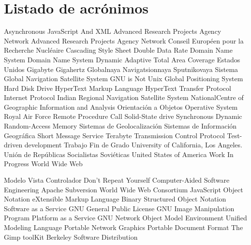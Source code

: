 \chapter{Listado de acrónimos}

{\small
\begin{acronym}[XXXXXXXX]
	         {Asynchronous JavaScript And XML}
	        {Advanced Research Projects Agency Network}
	        {Advanced Research Projects Agency Network}
	           {Conseil Européen pour la Recherche Nucléaire}
	            {Cascading Style Sheet}
	            {Double Data Rate}
	            {Domain Name System}
	            {Domain Name System}
	        {Dynamic Adaptive Total Area Coverage}
	         {Estados Unidos}
	             {Gigabyte}
	            {Gigahertz}
	        {Globalnaya Navigatsionnaya Sputnikovaya Sistema}
	           {Global Navigation Satellite System}
	            {\acs{GNU} is Not Unix}
	            {Global Positioning System}
	            {Hard Disk Drive}
	           {HyperText Markup Language}
	           {HyperText Transfer Protocol}
	             {Internet Protocol}
	          {Indian Regional Navigation Satellite System}
	          {NationalCentre of Geographic Information and Analysis}
	             {Orientación a Objetos}
	             {Operative System}
	            {Royal Air Force}
	            {Remote Procedure Call}
	            {Solid-State drive}
	          {Synchronous Dynamic Random-Access Memory}
	             {Sistemas de Geolocalización}
	            {Sistemas de Información Geográfica}
	            {Short Message Service}
	             {Terabyte}
	            {Transmission Control Protocol}
	            {Test-driven development}
	            {Trabajo Fin de Grado}
	           {University of California, Los Angeles}.
	           {Unión de Repúblicas Socialistas Soviéticas}
	            {United States of America}
	            {Work In Progress}
	            {World Wide Web}
	
			{Modelo Vista Controlador}
			{Don't Repeat Yourself}
			{Computer-Aided Software Engineering}
			{Apache Subversion}
			{World Wide Web Consortium}
			{JavaScript Object Notation}
			{eXtensible Markup Language}
			{Binary Structured Object Notation}
			{Software as a Service}
			{\acs{GNU} General Public License}
			{\acs{GNU} Image Manipulation Program} 
			{Platform as a Service}
		{GNU Network Object Model Environment}
			{Unified Modeling Language}
			{Portable Network Graphics}
			{Portable Document Format}
			{The Gimp toolKit}
			{Berkeley Software Distribution}
\end{acronym}
}


